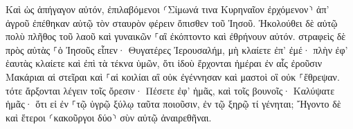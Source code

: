 \documentclass{openreader}
\begin{document}
Καὶ ὡς ἀπήγαγον αὐτόν, ἐπιλαβόμενοι ⸂Σίμωνά τινα Κυρηναῖον ἐρχόμενον⸃ ἀπ’ ἀγροῦ ἐπέθηκαν αὐτῷ τὸν σταυρὸν φέρειν ὄπισθεν τοῦ Ἰησοῦ. 
Ἠκολούθει δὲ αὐτῷ πολὺ πλῆθος τοῦ λαοῦ καὶ γυναικῶν ⸀αἳ ἐκόπτοντο καὶ ἐθρήνουν αὐτόν. 
στραφεὶς δὲ πρὸς αὐτὰς ⸀ὁ Ἰησοῦς εἶπεν· Θυγατέρες Ἰερουσαλήμ, μὴ κλαίετε ἐπ’ ἐμέ· πλὴν ἐφ’ ἑαυτὰς κλαίετε καὶ ἐπὶ τὰ τέκνα ὑμῶν, 
ὅτι ἰδοὺ ἔρχονται ἡμέραι ἐν αἷς ἐροῦσιν Μακάριαι αἱ στεῖραι καὶ ⸀αἱ κοιλίαι αἳ οὐκ ἐγέννησαν καὶ μαστοὶ οἳ οὐκ ⸀ἔθρεψαν. 
τότε ἄρξονται λέγειν τοῖς ὄρεσιν· Πέσετε ἐφ’ ἡμᾶς, καὶ τοῖς βουνοῖς· Καλύψατε ἡμᾶς· 
ὅτι εἰ ἐν ⸀τῷ ὑγρῷ ξύλῳ ταῦτα ποιοῦσιν, ἐν τῷ ξηρῷ τί γένηται; 
Ἤγοντο δὲ καὶ ἕτεροι ⸂κακοῦργοι δύο⸃ σὺν αὐτῷ ἀναιρεθῆναι. 
\end{document}
